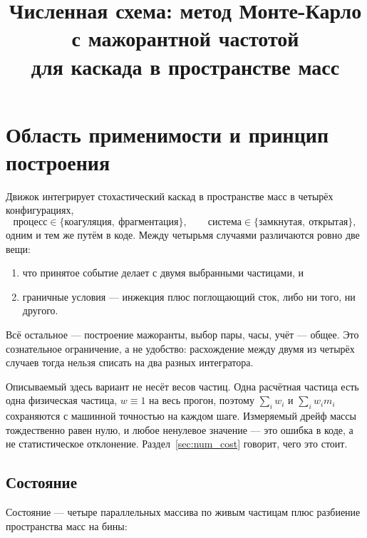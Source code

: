 \documentclass[a4paper,12pt]{article}
\begin{document}

\title{Численная схема: метод Монте-Карло с мажорантной частотой\\ для каскада в пространстве масс}
\author{}
\date{}
\maketitle

\section{Область применимости и принцип построения}
\label{sec:num_scope}

Движок интегрирует стохастический каскад в пространстве масс в четырёх
конфигурациях,
\[
  \text{процесс} \in \{\text{коагуляция},\ \text{фрагментация}\},
  \qquad
  \text{система} \in \{\text{замкнутая},\ \text{открытая}\},
\]
одним и тем же путём в коде. Между четырьмя случаями различаются ровно две
вещи:

\begin{enumerate}
  \item что принятое событие делает с двумя выбранными частицами, и
  \item граничные условия --- инжекция плюс поглощающий сток, либо ни того,
        ни другого.
\end{enumerate}

Всё остальное --- построение мажоранты, выбор пары, часы, учёт ---
общее. Это сознательное ограничение, а не удобство: расхождение между
двумя из четырёх случаев тогда нельзя списать на два разных интегратора.

Описываемый здесь вариант не несёт весов частиц. Одна расчётная частица
есть одна физическая частица, $w \equiv 1$ на весь прогон, поэтому
$\sum_i w_i$ и $\sum_i w_i m_i$ сохраняются с машинной точностью на каждом
шаге. Измеряемый дрейф массы тождественно равен нулю, и любое ненулевое
значение --- это ошибка в коде, а не статистическое отклонение.
Раздел~\ref{sec:num_cost} говорит, чего это стоит.

\subsection{Состояние}

Состояние --- четыре параллельных массива по живым частицам плюс разбиение
пространства масс на бины:
\end{document}
